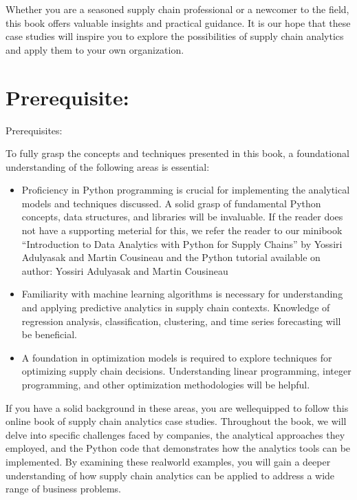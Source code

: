 \documentclass[letterpaper,10pt,english]{jupyterBook}
\begin{document}
\sphinxAtStartPar
Whether you are a seasoned supply chain professional or a newcomer to the field, this book offers valuable insights and practical guidance. It is our hope that these case studies will inspire you to explore the possibilities of supply chain analytics and apply them to your own organization.


\section{Prerequisite:}
\label{\detokenize{docs/introduction:prerequisite}}
\sphinxAtStartPar
Prerequisites:

\sphinxAtStartPar
To fully grasp the concepts and techniques presented in this book, a foundational understanding of the following areas is essential:
\begin{itemize}
\item {} 
\sphinxAtStartPar
{} Proficiency in Python programming is crucial for implementing the analytical models and techniques discussed. A solid grasp of fundamental Python concepts, data structures, and libraries will be invaluable. If the reader does not have a supporting meterial for this, we refer the reader to our mini\sphinxhyphen{}book “Introduction to Data Analytics with Python for Supply Chains” by Yossiri Adulyasak and Martin Cousineau and the Python tutorial available on 
author: Yossiri Adulyasak and Martin Cousineau

\item {} 
\sphinxAtStartPar
{} Familiarity with machine learning algorithms is necessary for understanding and applying predictive analytics in supply chain contexts. Knowledge of regression analysis, classification, clustering, and time series forecasting will be beneficial.

\item {} 
\sphinxAtStartPar
{} A foundation in optimization models is required to explore techniques for optimizing supply chain decisions. Understanding linear programming, integer programming, and other optimization methodologies will be helpful.

\end{itemize}

\sphinxAtStartPar
If you have a solid background in these areas, you are well\sphinxhyphen{}equipped to follow this online book of supply chain analytics case studies. Throughout the book, we will delve into specific challenges faced by companies, the analytical approaches they employed, and the Python code that demonstrates how the analytics tools can be implemented. By examining these real\sphinxhyphen{}world examples, you will gain a deeper understanding of how supply chain analytics can be applied to address a wide range of business problems.
\end{document}
